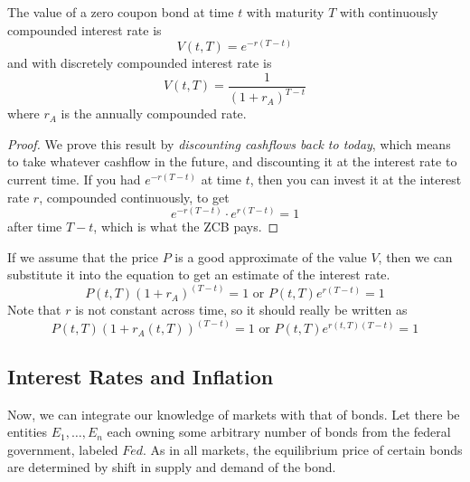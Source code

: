 \documentclass{article}
\begin{document}
    \begin{theorem}
      The value of a zero coupon bond at time $t$ with maturity $T$ with continuously compounded interest rate is 
      \begin{equation}
        V(t, T) = e^{-r(T-t)}
      \end{equation}
      and with discretely compounded interest rate is 
      \begin{equation}
        V(t, T) = \frac{1}{(1 + r_A)^{T - t}}
      \end{equation}
      where $r_A$ is the annually compounded rate. 
    \end{theorem}
    \begin{proof}
      We prove this result by \textit{discounting cashflows back to today}, which means to take whatever cashflow in the future, and discounting it at the interest rate to current time. If you had $e^{-r (T - t)}$ at time $t$, then you can invest it at the interest rate $r$, compounded continuously, to get 
      \begin{equation}
        e^{- r(T - t)} \cdot e^{r (T - t)} = 1
      \end{equation}
      after time $T - t$, which is what the ZCB pays. 
    \end{proof}

    If we assume that the price $P$ is a good approximate of the value $V$, then we can substitute it into the equation to get an estimate of the interest rate.  
    \begin{equation}
      P(t, T) (1 + r_A)^{(T - t)} = 1 \text{ or } P(t, T) e^{r (T - t)} = 1
    \end{equation}
    Note that $r$ is not constant across time, so it should really be written as 
    \begin{equation}
      P(t, T) (1 + r_A(t, T))^{(T - t)} = 1 \text{ or } P(t, T) e^{r(t, T) (T - t)} = 1
    \end{equation}

  \subsection{Interest Rates and Inflation}

    Now, we can integrate our knowledge of markets with that of bonds. Let there be entities $E_1, \ldots, E_n$ each owning some arbitrary number of bonds from the federal government, labeled $Fed$. As in all markets, the equilibrium price of certain bonds are determined by shift in supply and demand of the bond.
\end{document}

